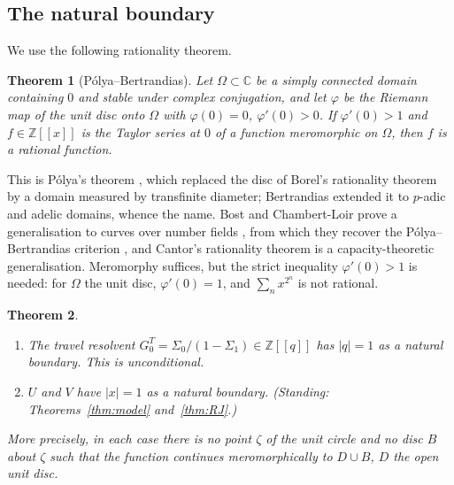 \documentclass[11pt]{article}
\theoremstyle{plain}
\newtheorem{theorem}{Theorem}
\theoremstyle{definition}
\theoremstyle{remark}
\newcommand{\Z}{\mathbb{Z}}
\newcommand{\C}{\mathbb{C}}
\theoremstyle{plain}\newtheorem*{maintheorem}{Main Theorem}
\begin{document}
\subsection{The natural boundary}

We use the following rationality theorem.

\begin{theorem}[P\'olya--Bertrandias]\label{thm:PB}
Let $\Omega\subset\C$ be a simply connected domain containing $0$ and stable under complex
conjugation, and let $\varphi$ be the Riemann map of the unit disc onto $\Omega$ with
$\varphi(0)=0$, $\varphi'(0)>0$. If $\varphi'(0)>1$ and $f\in\Z[[x]]$ is the Taylor series at $0$ of
a function meromorphic on $\Omega$, then $f$ is a rational function.
\end{theorem}

\noindent This is P\'olya's theorem \cite{Polya1928}, which replaced the disc of Borel's
rationality theorem by a domain measured by transfinite diameter; Bertrandias
\cite{Bertrandias1964} extended it to $p$-adic and adelic domains, whence the name. Bost and
Chambert-Loir prove a generalisation to curves over number fields
\cite[Thm.~7.9]{BostChambertLoir2009}, from which they recover the P\'olya--Bertrandias criterion
\cite[Example~7.10]{BostChambertLoir2009}, and Cantor's rationality theorem
\cite[Thm.~5.2.2]{Cantor1980} is a capacity-theoretic generalisation. Meromorphy suffices, but the strict
inequality $\varphi'(0)>1$ is needed: for $\Omega$ the unit disc, $\varphi'(0)=1$, and
$\sum_nx^{2^n}$ is not rational.

\begin{theorem}\label{thm:natboundary}
\begin{enumerate}[label=\textup{(\alph*)},leftmargin=2.2em,itemsep=0.1em,topsep=0.2em]
\item The travel resolvent $G^T_0=\Sigma_0/(1-\Sigma_1)\in\Z[[q]]$ has $|q|=1$ as a natural
boundary. This is unconditional.
\item $U$ and $V$ have $|x|=1$ as a natural boundary. \textup{(}Standing: Theorems~\ref{thm:model}
and~\ref{thm:RJ}.\textup{)}
\end{enumerate}
More precisely, in each case there is no point $\zeta$ of the unit circle and no disc $B$ about
$\zeta$ such that the function continues meromorphically to $D\cup B$, $D$ the open unit disc.
\end{theorem}
\end{document}
